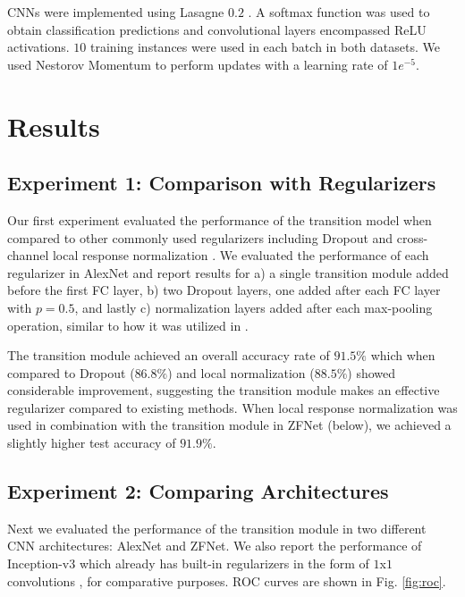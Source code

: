 \documentclass[runningheads,a4paper]{llncs}
\begin{document}
CNNs were implemented using Lasagne $0.2$ \cite{Lasagne}. A softmax function was used to obtain classification predictions and convolutional layers encompassed Re{LU} activations. $10$ training instances were used in each batch in both datasets. We used Nestorov Momentum \cite{Sutskever2013} to perform updates with a learning rate of $1e^{-5}$.

\section{Results}


\subsection{Experiment 1: Comparison with Regularizers}
\label{sec:r_regularizers}

Our first experiment evaluated the performance of the transition model when compared to other commonly used regularizers including Dropout \cite{Srivastava2014} and cross-channel local response normalization \cite{Krizhevsky2012}. We evaluated the performance of each regularizer in AlexNet and report results for a) a single transition module added before the first FC layer, b) two Dropout layers, one added after each FC layer with $p=0.5$, and lastly c) normalization layers added after each max-pooling operation, similar to how it was utilized in \cite{Krizhevsky2012}. 

The transition module achieved an overall accuracy rate of $91.5\%$ which when compared to Dropout ($86.8\%$) and local normalization ($88.5\%$) showed considerable improvement, suggesting the transition module makes an effective regularizer compared to existing methods. When local response normalization was used in combination with the transition module in ZFNet (below), we achieved a slightly higher test accuracy of $91.9\%$.


\subsection{Experiment 2: Comparing Architectures}
\label{sec:r_architecture}

Next we evaluated the performance of the transition module in two different CNN architectures: AlexNet and ZFNet. We also report the performance of Inception-v3 which already has built-in regularizers in the form of $1$x$1$ convolutions \cite{Szegedy2016}, for comparative purposes. ROC curves are shown in Fig. \ref{fig:roc}.
\end{document}
